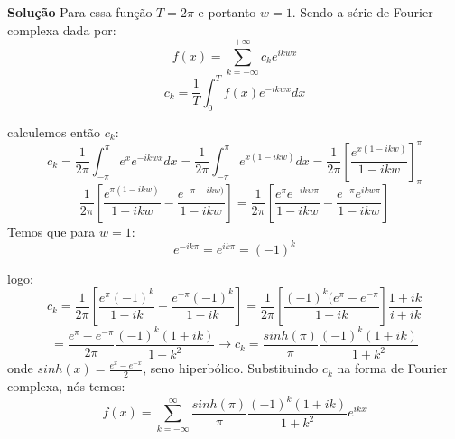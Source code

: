 \linespread{1.5}
\textbf{Solução}
Para essa função $T=2\pi$ e portanto $w=1$.
Sendo a série de Fourier complexa dada por:
\begin{equation}
    \label{eq:Fouriercomplexa}
    f(x) = \sum^{+\infty}_{k=-\infty} c_k e^{ikwx}
\end{equation}
\begin{equation}
    \label{eq:ckFouerier}
    c_k = \frac{1}{T} \int^T_0 f(x)e^{-ikwx}dx
\end{equation}

calculemos então $c_k$:
\begin{equation*}
    c_k = \frac{1}{2\pi}\int_{-\pi}^\pi e^x e^{-ikwx}dx = \frac{1}{2\pi}\int_{-\pi}^\pi e^{x(1-ikw)}dx = \frac{1}{2\pi}\left[\frac{e^{x(1-ikw)}}{1-ikw}\right]_{\pi}^\pi  
\end{equation*}
\begin{equation*}
    \frac{1}{2\pi}\left[\frac{e^{\pi(1-ikw)}}{1-ikw} - \frac{e^{-\pi-ikw)}}{1-ikw}\right] = \frac{1}{2\pi}\left[\frac{e^\pi e^{-ikw\pi}}{1-ikw} - \frac{e^{-\pi}e^{ikw\pi}}{1-ikw}\right]
\end{equation*}
Temos que para $w=1$:
\begin{equation*}
    e^{-ik\pi} = e^{ik\pi} = (-1)^k
\end{equation*}

logo:
\begin{equation*}
    c_k = \frac{1}{2\pi}\left[\frac{e^\pi (-1)^k}{1-ik} - \frac{e^{-\pi}(-1)^k}{1-ik}\right] = \frac{1}{2\pi}\left[\frac{(-1)^k(e^\pi - e^{-\pi}}{1-ik}\right]\frac{1+ik}{i+ik}
\end{equation*}
\begin{equation*}
    = \frac{e^\pi - e^{-\pi}}{2\pi}\frac{(-1)^k(1+ik)}{1+k^2} \rightarrow{} \boxed{c_k = \frac{sinh(\pi)}{\pi}\frac{(-1)^k(1+ik)}{1+k^2}}
\end{equation*}
onde $sinh(x) = \frac{e^x-e^{-x}}{2}$, seno hiperbólico. Substituindo $c_k$ na forma de Fourier complexa, nós temos:
\begin{equation}
    \boxed{f(x) = \sum^\infty_{k=-\infty} \frac{sinh(\pi)}{\pi}\frac{(-1)^k(1+ik)}{1+k^2}e^{ikx}}
\end{equation}